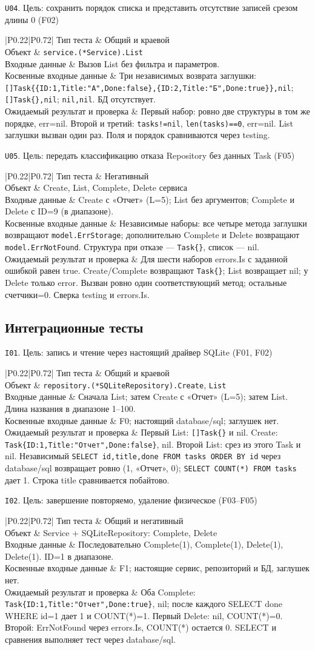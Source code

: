 \documentclass[12pt,a4paper]{extarticle}
\newcommand{\code}[1]{\nolinkurl{#1}}
\newcommand{\rucode}[1]{\texttt{#1}}
\newcommand{\testcase}[6]{%
  \par\addvspace{12pt}\noindent #1\par\nopagebreak
  \begin{longtable}{|P{0.22\textwidth}|P{0.72\textwidth}|}
  \hline
  Тип теста & #2 \\ \hline
  Объект & #3 \\ \hline
  Входные данные & #4 \\ \hline
  Косвенные входные данные & #5 \\ \hline
  Ожидаемый результат и проверка & #6 \\ \hline
  \end{longtable}}
\begin{document}
\testcase{\texttt{U04}. Цель: сохранить порядок списка и представить отсутствие записей срезом длины 0 (F02)}
{Общий и краевой}
{\code{service.(*Service).List}}
{Вызов List без фильтра и параметров.}
{Три независимых возврата заглушки:
\rucode{[]Task\{\{ID:1,\allowbreak{}Title:"А",\allowbreak{}Done:false\},\allowbreak{}\{ID:2,\allowbreak{}Title:"Б",\allowbreak{}Done:true\}\},\allowbreak{}nil};
\rucode{[]Task\{\},\allowbreak{}nil}; \code{nil,nil}. БД отсутствует.}
{Первый набор: ровно две структуры в том же порядке, err=nil.
Второй и третий: \code{tasks!=nil}, \code{len(tasks)==0}, err=nil.
List заглушки вызван один раз. Поля и порядок сравниваются через testing.}

\testcase{\texttt{U05}. Цель: передать классификацию отказа Repository без данных Task (F05)}
{Негативный}
{Create, List, Complete, Delete сервиса}
{Create с «Отчет» (L=5); List без аргументов; Complete и Delete
с ID=9 (в диапазоне).}
{Независимые наборы: все четыре метода заглушки возвращают
\code{model.ErrStorage}; дополнительно Complete и Delete возвращают
\code{model.ErrNotFound}. Структура при отказе --- \rucode{Task\{\}}, список --- nil.}
{Для шести наборов errors.Is с заданной ошибкой равен true.
Create/Complete возвращают \rucode{Task\{\}}; List возвращает nil;
у Delete только error. Вызван ровно один соответствующий метод;
остальные счетчики=0. Сверка testing и errors.Is.}

\subsection{Интеграционные тесты}
\testcase{\texttt{I01}. Цель: запись и чтение через настоящий драйвер SQLite (F01, F02)}
{Общий и краевой}
{\code{repository.(*SQLiteRepository).Create}, \code{List}}
{Сначала List; затем Create с «Отчет» (L=5); затем List.
Длина названия в диапазоне 1--100.}
{F0; настоящий database/sql; заглушек нет.}
{Первый List: \rucode{[]Task\{\}} и nil. Create:
\rucode{Task\{ID:1,\allowbreak{}Title:"Отчет",\allowbreak{}Done:false\}}, nil.
Второй List: срез из этого Task и nil.
Независимый \code{SELECT id,title,done FROM tasks ORDER BY id}
через database/sql возвращает ровно (1, «Отчет», 0);
\code{SELECT COUNT(*) FROM tasks} дает 1.
Строка title сравнивается побайтово.}

\testcase{\texttt{I02}. Цель: завершение повторяемо, удаление физическое (F03--F05)}
{Общий и негативный}
{Service + SQLiteRepository: Complete, Delete}
{Последовательно Complete(1), Complete(1), Delete(1), Delete(1).
ID=1 в диапазоне.}
{F1; настоящие сервис, репозиторий и БД, заглушек нет.}
{Оба Complete: \rucode{Task\{ID:1,\allowbreak{}Title:"Отчет",\allowbreak{}Done:true\}}, nil;
после каждого SELECT done WHERE id=1 дает 1 и COUNT(*)=1.
Первый Delete: nil, COUNT(*)=0. Второй: ErrNotFound через errors.Is,
COUNT(*) остается 0. SELECT и сравнения выполняет тест через database/sql.}
\end{document}
